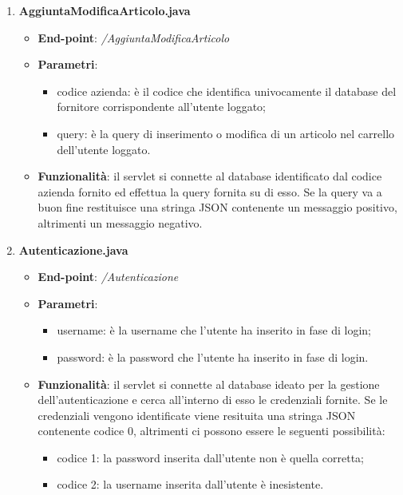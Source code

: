 \documentclass[12pt, a4paper, titlepage]{report}
\begin{document}
	\begin{enumerate}
		\item \textbf{AggiuntaModificaArticolo.java}
		\begin{itemize}
			\item \textbf{End-point}: \textit{/AggiuntaModificaArticolo}
			\item \textbf{Parametri}:
			\begin{itemize}
				\item codice azienda: è il codice che identifica univocamente il database del fornitore corrispondente all'utente loggato;
				\item query: è la query di inserimento o modifica di un articolo nel carrello dell'utente loggato.
			\end{itemize}
			\item \textbf{Funzionalità}: il servlet si connette al database identificato dal codice azienda fornito ed effettua la query fornita su di esso. Se la query va a buon fine restituisce una stringa JSON contenente un messaggio positivo, altrimenti un messaggio negativo.
		\end{itemize}
	
		\item \textbf{Autenticazione.java}
		\begin{itemize}
			\item \textbf{End-point}: \textit{/Autenticazione}
			\item \textbf{Parametri}:
			\begin{itemize}
				\item username: è la username che l'utente ha inserito in fase di login;
				\item password: è la password che l'utente ha inserito in fase di login.
			\end{itemize}
			\item \textbf{Funzionalità}: il servlet si connette al database ideato per la gestione dell'autenticazione e cerca all'interno di esso le credenziali fornite. Se le credenziali vengono identificate viene resituita una stringa JSON contenente codice 0, altrimenti ci possono essere le seguenti possibilità:
			\begin{itemize}
				\item codice 1: la password inserita dall'utente non è quella corretta;
				\item codice 2: la username inserita dall'utente è inesistente.
			\end{itemize}
		\end{itemize}
	

\end{enumerate}
\end{document}
